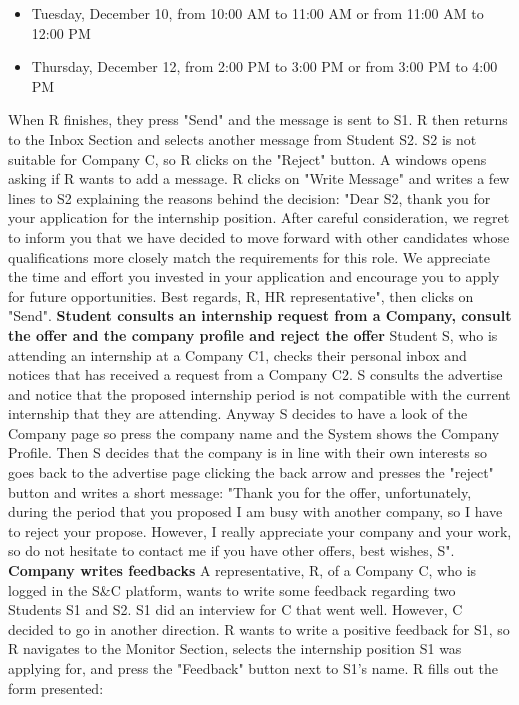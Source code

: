\begin{itemize}
    \item Tuesday, December 10, from 10:00 AM to 11:00 AM or from 11:00 AM to 12:00 PM
    \item Thursday, December 12, from 2:00 PM to 3:00 PM or from 3:00 PM to 4:00 PM
\end{itemize}
When R finishes, they press "Send" and the message is sent to S1. 
R then returns to the Inbox Section and selects another message from Student S2. S2 is not suitable for Company C, so R clicks on the "Reject" button. A windows opens asking if R wants to add a message. R clicks on "Write Message" and writes a few lines to S2 explaining the reasons behind the decision: "Dear S2, thank you for your application for the internship position. After careful consideration, we regret to inform you that we have decided to move forward with other candidates whose qualifications more closely match the requirements for this role. We appreciate the time and effort you invested in your application and encourage you to apply for future opportunities.
Best regards,
R, HR representative", then clicks on "Send".
\newline\newline
\textbf{Student consults an internship request from a Company, consult the offer and the company profile and reject the offer}
\newline
Student S, who is attending an internship at a Company C1, checks their personal inbox and notices that has received a request from a Company C2. S consults the advertise and notice that the proposed internship period is not compatible with the current internship that they are attending. Anyway S decides to have a look of the Company page so press the company name and the System shows the Company Profile. Then S decides that the company is in line with their own interests so goes back to the advertise page clicking the back arrow and presses the "reject" button and writes a short message: "Thank you for the offer, unfortunately, during the period that you proposed I am busy with another company, so I have to reject your propose. However, I really appreciate your company and your work, so do not hesitate to contact me if you have other offers, best wishes, S".
\newline\newline
\textbf{Company writes feedbacks}
\newline
A representative, R, of a Company C, who is logged in the S\&C platform, wants to write some feedback regarding two Students S1 and S2. S1 did an interview for C that went well. However, C decided to go in another direction. R wants to write a positive feedback for S1, so R navigates to the Monitor Section, selects the internship position S1 was applying for, and press the "Feedback" button next to S1's name. R fills out the form presented:
